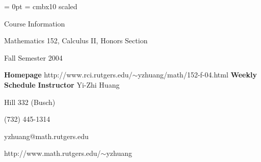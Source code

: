 \magnification \magstephalf
\nopagenumbers
\parindent = 0pt
\font\lgbf = cmbx10 scaled 
\centerline {\lgbf Course Information}
\smallskip
\centerline {\lgbf Mathematics 152, Calculus II, Honors Section}
\smallskip
\centerline {\lgbf Fall Semester 2004}
\bigskip
{\bf Homepage} 
\smallskip
http://www.rci.rutgers.edu/$\sim$yzhuang/math/152-f-04.html %
\bigskip
{\bf Weekly Schedule} 
\smallskip
\def \as {\phantom {$\ast$}}
\bigskip
{\bf Instructor} \enspace Yi-Zhi Huang %

 \enspace Hill 332 (Busch) %

 \enspace (732) 445-1314 %

 \enspace yzhuang@math.rutgers.edu %

 \enspace 
http://www.math.rutgers.edu/$\sim$yzhuang %

